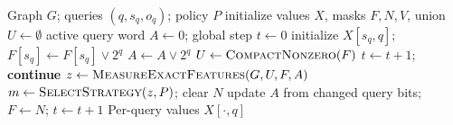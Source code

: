 \begin{algorithm}[t]
  \caption{Exact execution of one scheduled query batch}
  \label{alg:execute-batch}
  \footnotesize
  \begin{algorithmic}[1]
    \Require Graph $G$; queries $(q,s_q,o_q)$; policy $P$
    \State initialize values $X$, masks $F,N,V$, union $U\gets\emptyset$
    \State active query word $A\gets 0$; global step $t\gets 0$
        \State initialize $X[s_q,q]$; $F[s_q]\gets F[s_q]\lor 2^q$
        \State $A\gets A\lor 2^q$
      \EndFor
      \State $U\gets\Call{CompactNonzero}{F}$
       \State $t\gets t+1$; \textbf{continue} \EndIf
      \State $z\gets\Call{MeasureExactFeatures}{G,U,F,A}$
      \State $m\gets\Call{SelectStrategy}{z,P}$; clear $N$
        \State {}
      \Else
        \State {}
      \EndIf
      \State update $A$ from changed query bits; $F\gets N$; $t\gets t+1$
    \EndWhile
    \Ensure Per-query values $X[\cdot,q]$
  \end{algorithmic}
\end{algorithm}
